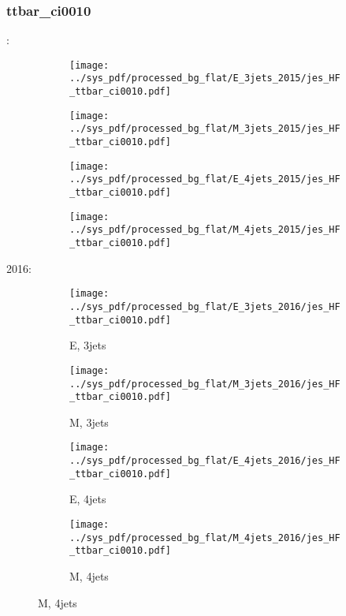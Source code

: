 \documentclass{beamer}
\begin{document}
\begin{frame}
\frametitle{ttbar_ci0010}
\fontsize{5}{1}:
\begin{figure}
\centering
\begin{subfigure}[b]{0.24\textwidth}
\texttt{[image: ../sys\_pdf/processed\_bg\_flat/E\_3jets\_2015/jes\_HF\_ttbar\_ci0010.pdf]}
\end{subfigure}
\begin{subfigure}[b]{0.24\textwidth}
\texttt{[image: ../sys\_pdf/processed\_bg\_flat/M\_3jets\_2015/jes\_HF\_ttbar\_ci0010.pdf]}
\end{subfigure}
\begin{subfigure}[b]{0.24\textwidth}
\texttt{[image: ../sys\_pdf/processed\_bg\_flat/E\_4jets\_2015/jes\_HF\_ttbar\_ci0010.pdf]}
\end{subfigure}
\begin{subfigure}[b]{0.24\textwidth}
\texttt{[image: ../sys\_pdf/processed\_bg\_flat/M\_4jets\_2015/jes\_HF\_ttbar\_ci0010.pdf]}
\end{subfigure}
\end{figure}
2016:
\begin{figure}
\centering
\begin{subfigure}[b]{0.24\textwidth}
\texttt{[image: ../sys\_pdf/processed\_bg\_flat/E\_3jets\_2016/jes\_HF\_ttbar\_ci0010.pdf]}
\captionsetup{font=tiny}
\caption{E, 3jets}
\end{subfigure}
\begin{subfigure}[b]{0.24\textwidth}
\texttt{[image: ../sys\_pdf/processed\_bg\_flat/M\_3jets\_2016/jes\_HF\_ttbar\_ci0010.pdf]}
\captionsetup{font=tiny}
\caption{M, 3jets}
\end{subfigure}
\begin{subfigure}[b]{0.24\textwidth}
\texttt{[image: ../sys\_pdf/processed\_bg\_flat/E\_4jets\_2016/jes\_HF\_ttbar\_ci0010.pdf]}
\captionsetup{font=tiny}
\caption{E, 4jets}
\end{subfigure}
\begin{subfigure}[b]{0.24\textwidth}
\texttt{[image: ../sys\_pdf/processed\_bg\_flat/M\_4jets\_2016/jes\_HF\_ttbar\_ci0010.pdf]}
\captionsetup{font=tiny}
\caption{M, 4jets}
\end{subfigure}
\end{figure}
\end{frame}
\end{document}
